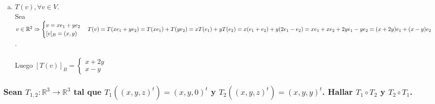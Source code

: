 \documentclass{article}
\begin{document}
\begin{enumerate}[a.]
	\item
		$T(v), \forall v \in V$. \\
		Sea $v \in \mathbb{R}^2 \Rightarrow 
		\begin{cases}
		v = xe_1 + ye_2 \\
		[v]_B = (x,y)
		\end{cases}
		\\ \\
		T(v) = T(xe_1 + ye_2) = T(xe_1) + T(ye_2) = xT(e_1) + yT(e_2) = x(e_1+e_2) + y(2e_1-e_2) = \\
		xe_1+xe_2 + 2ye_1 - ye_2 = (x+2y)e_1 + (x-y)e_2$.
		\\ \\
		Luego $[T(v)]_B = \begin{cases} x+2y \\ x-y \end{cases}$
\end{enumerate}

\subsubsection{Sean $T_{1,2} : \mathbb{R}^3 \rightarrow \mathbb{R}^3$ tal que $T_1((x,y,z)^t) = (x,y,0)^t$ y 
$T_2((x,y,z)^t) = (x,y,y)^t$. Hallar $T_1 \circ T_2$ y $T_2 \circ T_1$.}
\end{document}
